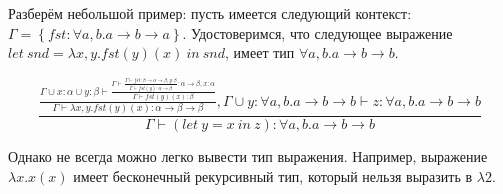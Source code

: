 Разберём небольшой пример: пусть имеется следующий контекст: $\Gamma = \left\{ fst: \forall a, b. a \to b \to a \right\}$.
Удостоверимся, что следующее выражение $let ~snd = \lambda x, y. fst(y)(x) ~in ~snd$, имеет тип $\forall a, b. a \to b \to b$.

\[
    \frac{
        \frac{
            \Gamma \cup x: \alpha \cup y: \beta \vdash \frac{
                \Gamma \vdash \frac{
                    \Gamma \vdash fst: \beta \to \alpha \to \beta, y: \beta
                }{
                    \Gamma \vdash fst(y): \alpha \to \beta
                }: \alpha \to \beta, x: \alpha
            }{
                \Gamma \vdash fst(y)(x): \beta
            }
        }{
            \Gamma \vdash \lambda x, y. fst(y)(x): \alpha \to \beta \to \beta
        }, \Gamma \cup y: \forall a, b. a \to b \to b \vdash z: \forall a, b. a \to b \to b
    }{
        \Gamma \vdash (let ~y = x ~in~ z): \forall a, b. a \to b \to b
    }
\]

Однако не всегда можно легко вывести тип выражения.
Например, выражение $\lambda x. x(x)$ имеет бесконечный рекурсивный тип, который нельзя выразить в $\lambda 2$.



